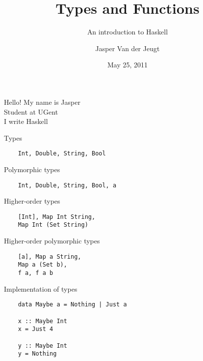 \documentclass[20pt]{beamer}
\begin{document}
\title{Types and Functions}
\subtitle{An introduction to Haskell}
\author{Jasper Van der Jeugt}
\date{May 25, 2011}

\begin{frame}[plain]
    \titlepage
\end{frame}


\begin{frame}{Hello!}
    My name is Jasper \\
    Student at UGent \\
    I write Haskell \\
\end{frame}

\begin{frame}[fragile]{Types}
    \begin{lstlisting}
    Int, Double, String, Bool
    \end{lstlisting}
\end{frame}

\begin{frame}[fragile]{Polymorphic types}
    \begin{lstlisting}
    Int, Double, String, Bool, a
    \end{lstlisting}
\end{frame}

\begin{frame}[fragile]{Higher-order types}
    \begin{lstlisting}
    [Int], Map Int String,
    Map Int (Set String)
    \end{lstlisting}
\end{frame}

\begin{frame}[fragile]{Higher-order polymorphic types}
    \begin{lstlisting}
    [a], Map a String,
    Map a (Set b),
    f a, f a b
    \end{lstlisting}
\end{frame}

\begin{frame}[fragile]{Implementation of types}
    \begin{lstlisting}
    data Maybe a = Nothing | Just a

    x :: Maybe Int
    x = Just 4

    y :: Maybe Int
    y = Nothing
    \end{lstlisting}
\end{frame}
\end{document}
